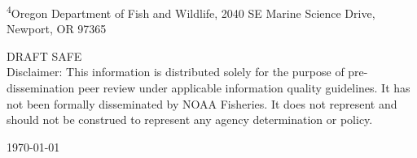 \begin{center}
\vspace{.3cm}

\textsuperscript{4}Oregon Department of Fish and Wildlife, 2040 SE Marine Science Drive, Newport, OR 97365\\


\vspace{.5cm}

\vfill
DRAFT SAFE\\
Disclaimer: This information is distributed solely for the purpose of pre-dissemination
peer review under applicable information quality guidelines. It has not been formally
disseminated by NOAA Fisheries. It does not represent and should not be construed to
represent any agency determination or policy. 

\vspace{.5cm}
{\large \today}

\maketitle

\setcounter{page}{1}
\end{center}


